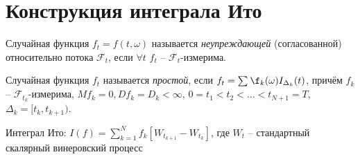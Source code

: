 \section{Конструкция интеграла Ито}

\begin{definition}
  Случайная функция $f_t = f(t, \omega)$ называется \emph{неупреждающей} (согласованной)
  относительно потока $\mathcal{F}_t$, если $\forall t$ $f_t$ -- $\mathcal{F}_t$-измерима.
\end{definition}

\begin{definition}
  Случайная функция $f_t$ называется \emph{простой}, если
  $f_t = \sum_{} \f_k(\omega) I_{\Delta_k}(t)$, причём $f_k$ -- $\mathcal{F}_{t_k}$-измерима, 
  $Mf_k = 0, Df_k = D_k < \infty$, $0 = t_1 < t_2 < \dots < t_{N+1} = T$, $\Delta_k = [t_{k}, t_{k+1})$.
\end{definition}

\begin{definition}
  Интеграл Ито:
  $I(f) = \sum_{k=1}^N f_k [W_{t_{k+1}} - W_{t_k}]$,
  где $W_t$ -- стандартный скалярный винеровский процесс
\end{definition}

